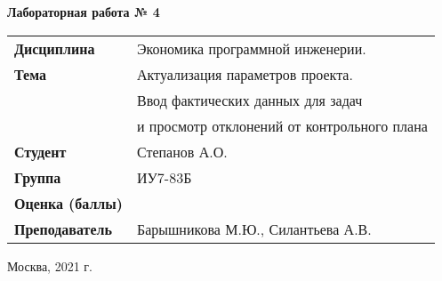 \begin{center}
    \textbf{Лабораторная работа № 4} \\
    \vspace{0.5cm}
\end{center}

\vspace{4cm}

\begin{flushleft}
    \begin{tabular}{ll}
        \textbf{Дисциплина} & Экономика программной инженерии. \\
        \textbf{Тема} & Актуализация параметров проекта. \\
                      & Ввод фактических данных для задач \\
                      & и просмотр отклонений от контрольного плана \\
        \textbf{Студент} & Степанов А.О. \\
        \textbf{Группа} & ИУ7-83Б \\
        \textbf{Оценка (баллы)} & \\
        \textbf{Преподаватель} & Барышникова М.Ю., Силантьева А.В. \\
    \end{tabular}
\end{flushleft}

\vspace{4cm}

\begin{center}
    Москва, 2021 г.
\end{center}

